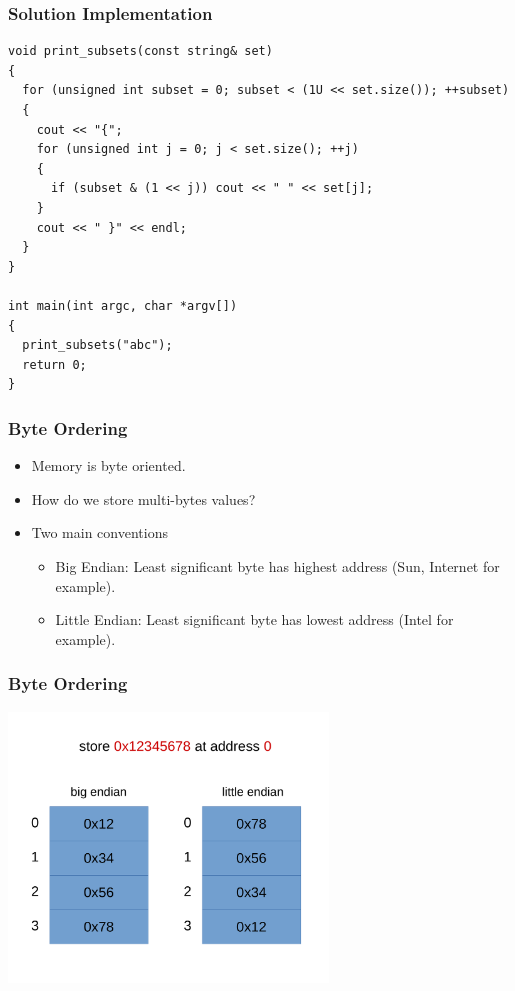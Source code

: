 \documentclass{beamer}
\begin{document}
\ifanswers

\begin{frame}[containsverbatim]
\frametitle{Solution Implementation}

\scriptsize

\begin{lstlisting}[mathescape]
void print_subsets(const string& set)
{
  for (unsigned int subset = 0; subset < (1U << set.size()); ++subset)
  {
    cout << "{";
    for (unsigned int j = 0; j < set.size(); ++j)
    {
      if (subset & (1 << j)) cout << " " << set[j];
    }
    cout << " }" << endl;
  }
}

int main(int argc, char *argv[])
{
  print_subsets("abc");
  return 0;
}
\end{lstlisting}

\end{frame}

\fi

\begin{frame}%
\frametitle{Byte Ordering}

\begin{itemize}

\item Memory is byte oriented.
\vspace{0.3cm}
\item How do we store multi-bytes values?
\vspace{0.3cm}
\item Two main conventions
  \begin{itemize}
  \item Big Endian: Least significant byte has highest address (Sun, Internet for example).
    \vspace{0.1cm}
  \item Little Endian: Least significant byte has lowest address (Intel for example).
  \end{itemize}

\end{itemize}

\end{frame}

\begin{frame}%
\frametitle{Byte Ordering}

\begin{center}
\includegraphics[width=8.5cm]{endian.pdf}
\end{center}

\end{frame}
\end{document}
